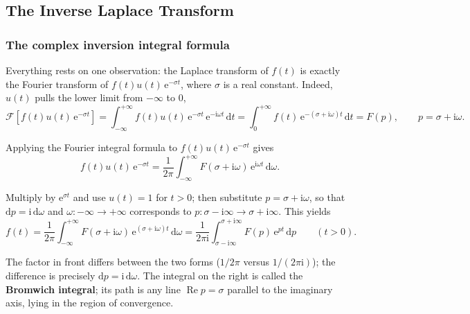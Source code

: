 \documentclass[11pt,a4paper]{article}
\theoremstyle{definition}
\theoremstyle{plain}
\begin{document}
\subsection{The Inverse Laplace Transform}

\subsubsection{The complex inversion integral formula}

Everything rests on one observation: the Laplace transform of $f(t)$ is exactly the Fourier
transform of $f(t)u(t)\,\mathrm{e}^{-\sigma t}$, where $\sigma$ is a real constant. Indeed, $u(t)$
pulls the lower limit from $-\infty$ to $0$,
\begin{equation*}
\mathcal{F}\left[f(t)u(t)\,\mathrm{e}^{-\sigma t}\right]
=\int_{-\infty}^{+\infty}f(t)u(t)\,\mathrm{e}^{-\sigma t}\,\mathrm{e}^{-\mathrm{i}\omega t}\,\mathrm{d}t
=\int_{0}^{+\infty}f(t)\,\mathrm{e}^{-(\sigma+\mathrm{i}\omega)t}\,\mathrm{d}t=F(p),
\qquad p=\sigma+\mathrm{i}\omega .
\end{equation*}

Applying the Fourier integral formula to $f(t)u(t)\,\mathrm{e}^{-\sigma t}$ gives
\begin{equation*}
f(t)u(t)\,\mathrm{e}^{-\sigma t}=\frac{1}{2\pi}\int_{-\infty}^{+\infty}
F(\sigma+\mathrm{i}\omega)\,\mathrm{e}^{\mathrm{i}\omega t}\,\mathrm{d}\omega .
\end{equation*}

Multiply by $\mathrm{e}^{\sigma t}$ and use $u(t)=1$ for $t>0$; then substitute
$p=\sigma+\mathrm{i}\omega$, so that $\mathrm{d}p=\mathrm{i}\,\mathrm{d}\omega$ and
$\omega:-\infty\to+\infty$ corresponds to
$p:\sigma-\mathrm{i}\infty\to\sigma+\mathrm{i}\infty$. This yields
\begin{equation}
f(t)=\frac{1}{2\pi}\int_{-\infty}^{+\infty}F(\sigma+\mathrm{i}\omega)\,
\mathrm{e}^{(\sigma+\mathrm{i}\omega)t}\,\mathrm{d}\omega
=\frac{1}{2\pi\mathrm{i}}\int_{\sigma-\mathrm{i}\infty}^{\sigma+\mathrm{i}\infty}
F(p)\,\mathrm{e}^{pt}\,\mathrm{d}p\qquad(t>0). \tag{17.1}
\end{equation}

The factor in front differs between the two forms ($1/2\pi$ versus $1/(2\pi\mathrm{i})$); the
difference is precisely $\mathrm{d}p=\mathrm{i}\,\mathrm{d}\omega$. The integral on the right is
called the \textbf{Bromwich integral}; its path is any line $\operatorname{Re}p=\sigma$ parallel to
the imaginary axis, lying in the region of convergence.
\end{document}
